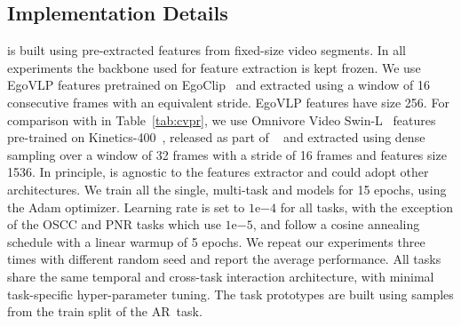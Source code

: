 \subsection{Implementation Details}\label{sec:exp_impl_details}
\ours is built using pre-extracted features from fixed-size video segments. In all experiments the backbone used for feature extraction is kept frozen.
%
We use EgoVLP features pretrained on EgoClip~\cite{lin2022egocentric} and extracted using a window of 16 consecutive frames with an equivalent stride. EgoVLP features have size 256.
For comparison with \ourscvpr in Table~\ref{tab:cvpr}, we use Omnivore Video Swin-L~\cite{omnivore} features pre-trained on Kinetics-400~\cite{quo_vadis}, released as part of \egofourd~\cite{ego4d} and extracted using dense sampling over a window of 32 frames with a stride of 16 frames and features size 1536.
In principle, \ours is agnostic to the features extractor and could adopt other architectures.
%
We train all the single, multi-task and \ours models for 15 epochs, using the Adam optimizer. Learning rate is set to $1\mathrm{e}{-4}$ for all tasks, with the exception of the OSCC and PNR tasks which use $1\mathrm{e}{-5}$, and follow a cosine annealing schedule with a linear warmup of 5 epochs.
We repeat our experiments three times with different random seed and report the average performance.
%
All tasks share the same temporal and cross-task interaction architecture, with minimal task-specific hyper-parameter tuning.
The task prototypes are built using samples from the train split of the AR~task.



